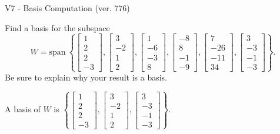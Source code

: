 \begin{exercise}
  \begin{exerciseTitle}V7 - Basis Computation (ver. 776)\end{exerciseTitle}
  \begin{exerciseStatement}
    Find a basis for the subspace 
\[W=\mathrm{span}\ \left\{\left[\begin{array}{r}
1 \\
2 \\
2 \\
-3
\end{array}\right] , \left[\begin{array}{r}
3 \\
-2 \\
1 \\
2
\end{array}\right] , \left[\begin{array}{r}
1 \\
-6 \\
-3 \\
8
\end{array}\right] , \left[\begin{array}{r}
-8 \\
8 \\
-1 \\
-9
\end{array}\right] , \left[\begin{array}{r}
7 \\
-26 \\
-11 \\
34
\end{array}\right] , \left[\begin{array}{r}
3 \\
-3 \\
-1 \\
-3
\end{array}\right]\right\}.\]
 Be sure to explain why your result is a basis.


  \end{exerciseStatement}
  \begin{exerciseAnswer}
   A basis of \(W\) is  \(\left\{\left[\begin{array}{r}
1 \\
2 \\
2 \\
-3
\end{array}\right] , \left[\begin{array}{r}
3 \\
-2 \\
1 \\
2
\end{array}\right] , \left[\begin{array}{r}
3 \\
-3 \\
-1 \\
-3
\end{array}\right]\right\}\).
  


  \end{exerciseAnswer}
\end{exercise}
